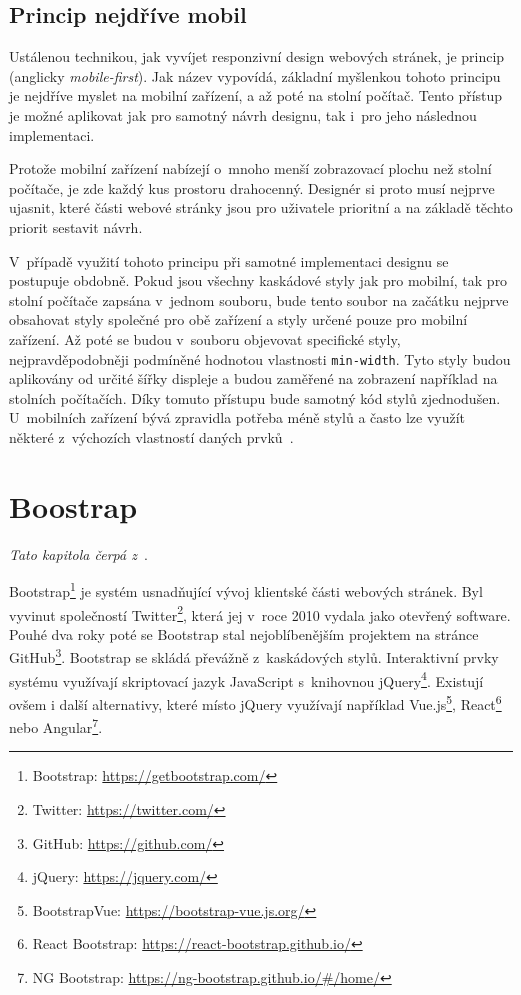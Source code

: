 \subsection{Princip nejdříve mobil}\label{section:mobile-first}
Ustálenou technikou, jak vyvíjet responzivní design webových stránek, je princip  (anglicky \emph{mobile-first}). Jak název vypovídá, základní myšlenkou tohoto principu je nejdříve myslet na mobilní zařízení, a až poté na stolní počítač. Tento přístup je možné aplikovat jak pro samotný návrh designu, tak i~pro jeho následnou implementaci.

Protože mobilní zařízení nabízejí o~mnoho menší zobrazovací plochu než stolní počítače, je zde každý kus prostoru drahocenný. Designér si proto musí nejprve ujasnit, které části webové stránky jsou pro uživatele prioritní a na základě těchto priorit sestavit návrh.

V~případě využití tohoto principu při samotné implementaci designu se postupuje obdobně. Pokud jsou všechny kaskádové styly jak pro mobilní, tak pro stolní počítače zapsána v~jednom souboru, bude tento soubor na začátku nejprve obsahovat styly společné pro obě zařízení a styly určené pouze pro mobilní zařízení. Až poté se budou v~souboru objevovat specifické styly, nejpravděpodobněji podmíněné hodnotou vlastnosti \texttt{min-width}. Tyto styly budou aplikovány od určité šířky displeje a budou zaměřené na zobrazení například na stolních počítačích. Díky tomuto přístupu bude samotný kód stylů zjednodušen. U~mobilních zařízení bývá zpravidla potřeba méně stylů a často lze využít některé z~výchozích vlastností daných prvků~\cite{bib:mobile-first}.


\section{Boostrap}
\emph{Tato kapitola čerpá z~\cite{bib:bootstrap}}.

Bootstrap\footnote{Bootstrap: \url{https://getbootstrap.com/}} je systém usnadňující vývoj klientské části webových stránek. Byl vyvinut společností Twitter\footnote{Twitter: \url{https://twitter.com/}}, která jej v~roce 2010 vydala jako otevřený software. Pouhé dva roky poté se Bootstrap stal nejoblíbenějším projektem na stránce GitHub\footnote{GitHub: \url{https://github.com/}}. Bootstrap se skládá převážně z~kaskádových stylů. Interaktivní prvky systému využívají skriptovací jazyk JavaScript s~knihovnou jQuery\footnote{jQuery: \url{https://jquery.com/}}. Existují ovšem i další alternativy, které místo jQuery využívají například Vue.js\footnote{BootstrapVue: \url{https://bootstrap-vue.js.org/}}, React\footnote{React Bootstrap: \url{https://react-bootstrap.github.io/}} nebo Angular\footnote{NG Bootstrap: \url{https://ng-bootstrap.github.io/\#/home/}}.

